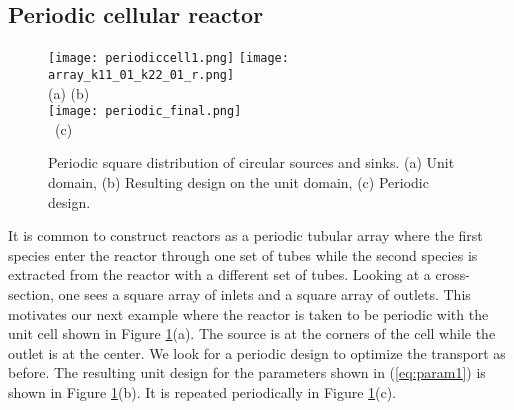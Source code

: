 \documentclass[11pt]{article}
\begin{document}
\subsection{Periodic cellular reactor}
\begin{figure}
\centering     
    \texttt{[image: periodiccell1.png]} \hspace{0.25in}
    \texttt{[image: array\_k11\_01\_k22\_01\_r.png]}\\
    \hspace{-0.3in} (a) \hspace{1.7in} (b)\\
    \texttt{[image: periodic\_final.png]}\\\
    (c)
    \caption{Periodic square distribution of circular sources and sinks. (a) Unit domain,  (b) Resulting design on the unit domain, (c) Periodic design.    \label{fig:periodic}}
\end{figure}

It is common to construct reactors as a periodic tubular array where the first species enter the reactor through one set of tubes while the second species is extracted from the reactor with a different set of tubes. Looking at a cross-section, one sees a square array of inlets and a square array of outlets. This motivates our next example where the reactor is taken to be periodic with the unit cell shown in Figure \ref{fig:periodic}(a). The source is at the corners of the cell while the outlet is at the center. We look for a periodic design to optimize the transport as before.  The resulting unit design for the parameters shown in (\ref{eq:param1}) is shown in Figure \ref{fig:periodic}(b).  It is repeated periodically in Figure \ref{fig:periodic}(c).
\end{document}
